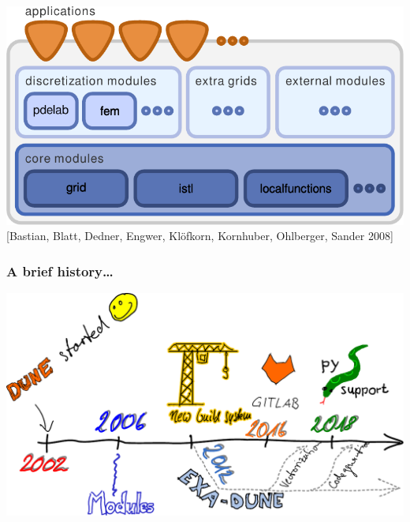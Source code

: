 \documentclass[aspectratio=169,11pt]{beamer}
\theoremstyle{definition}
\begin{document}
\begin{frame}
\begin{minipage}[t]{0.54\textwidth}
\begin{itemize}
        \end{itemize}
    \end{minipage}
  \hspace*{.4cm}
    \begin{minipage}[t]{0.45\textwidth}
      \mbox{}
      \begin{center}
        \includegraphics[width=\linewidth]{dunedesign}\\
        \scriptsize [Bastian,
        Blatt, Dedner, Engwer, Kl{\"{o}}fkorn, Kornhuber,
        Ohlberger, Sander 2008]
      \end{center}
    \end{minipage}
\end{frame}

\begin{frame}
  \frametitle{A brief history\ldots}
  \centering
%  
  \includegraphics[width=0.9\linewidth]{dunetimeline}
\end{frame}
\end{document}
